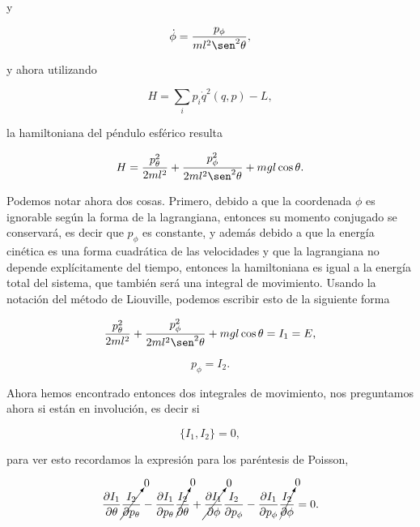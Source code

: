 \documentclass[a4paper,10pt]{article}
\numberwithin{equation}{section}
\begin{document}
y

\begin{equation}
 \dot{\phi} = \frac{p_\phi}{ml^2\sen^2{\theta}},
\end{equation}

y ahora utilizando 

\begin{equation}
 H = \sum_i p_i \dot{q}^2(q,p) - L, 
\end{equation}

la hamiltoniana del péndulo esférico resulta

\begin{equation}
 H = \frac{p_\theta^2}{2ml^2} + \frac{p_\phi^2}{2ml^2\sen^2{\theta}} 
 + mgl\cos{\theta}.
\end{equation}

Podemos notar ahora dos cosas. Primero, debido a que la coordenada $\phi$ es 
ignorable según la forma de la lagrangiana, entonces su momento conjugado se 
conservará, es decir que $p_\phi$ es constante, y además debido a que la energía 
cinética es una forma cuadrática de las velocidades y que la lagrangiana no depende 
explícitamente del tiempo, entonces la hamiltoniana es igual a la energía total 
del sistema, que también será una integral de movimiento. Usando la notación del
método de Liouville, podemos escribir esto de la siguiente forma 

\begin{equation}
  \frac{p_\theta^2}{2ml^2} + \frac{p_\phi^2}{2ml^2\sen^2{\theta}} 
 + mgl\cos{\theta} = I_1 = E,
 \label{eq:energiaPendEsf}
\end{equation}

\begin{equation}
 p_\phi = I_2.
 \label{eq:pphiPendEsf}
\end{equation}

Ahora hemos encontrado entonces dos integrales de movimiento, nos preguntamos ahora 
si están en involución, es decir si 

\begin{equation}
 \{I_1, I_2\} = 0,
\end{equation}

para ver esto recordamos la expresión para los paréntesis de Poisson, 

\begin{equation}
 \frac{\partial I_1}{\partial \theta}\cancelto{0}{\frac{I_2}{\partial p_\theta}} 
 - \frac{\partial I_1}{\partial p_\theta}\cancelto{0}{\frac{I_2}{\partial \theta}} + 
 \cancelto{0}{\frac{\partial I_1}{\partial \phi}}\frac{I_2}{\partial p_\phi} 
 - \frac{\partial I_1}{\partial p_\phi}\cancelto{0}{\frac{I_2}{\partial \phi}} = 
 0.
\end{equation}
\end{document}
